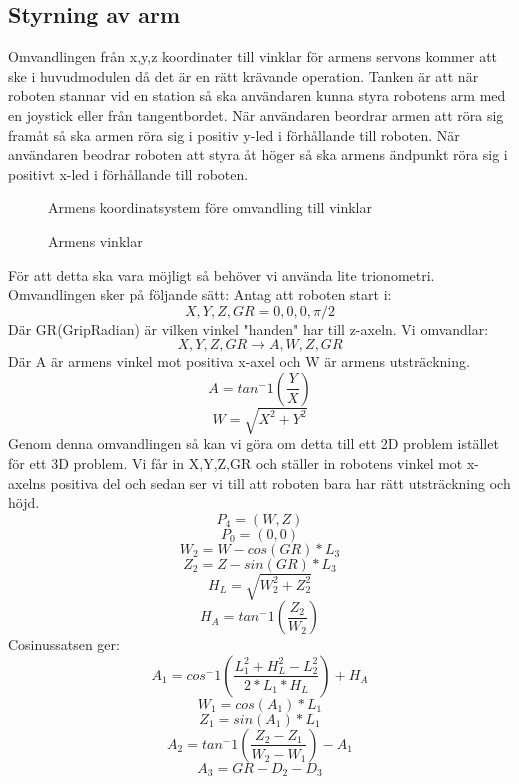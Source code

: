  \subsection{Styrning av arm}
 Omvandlingen från x,y,z koordinater till vinklar för armens servons kommer att ske i huvudmodulen då det är en rätt krävande operation. Tanken är att när roboten stannar vid en station så ska användaren kunna styra robotens arm med en joystick eller från tangentbordet. När användaren beordrar armen att röra sig framåt så ska armen röra sig i positiv y-led i förhållande till roboten. När användaren beodrar roboten att styra åt höger så ska armens ändpunkt röra sig i positivt x-led i förhållande till roboten.
 \newline
 \begin{figure}[h]
 \centerline{}
 \caption{Armens koordinatsystem före omvandling till vinklar}
 \end{figure}
 \begin{figure}[h]
\centerline{}
\caption{Armens vinklar}
\end{figure}
\newline
 För att detta ska vara möjligt så behöver vi använda lite trionometri. Omvandlingen sker på följande sätt:
Antag att roboten start i: $$X,Y,Z,GR=0,0,0,\pi/2$$
Där GR(GripRadian) är vilken vinkel "handen" har till z-axeln.\newline
Vi omvandlar:$$ X,Y,Z,GR\rightarrow A,W,Z,GR$$ 
Där A är armens vinkel mot positiva x-axel och W är armens utsträckning.
$$A=tan^-1(\dfrac{Y}{X}) $$
$$W=\sqrt{X^2+Y^2}$$
Genom denna omvandlingen så kan vi göra om detta till ett 2D problem istället för ett 3D problem. Vi får in X,Y,Z,GR och ställer in robotens vinkel mot x-axelns positiva del och sedan ser vi till att roboten bara har rätt utsträckning och höjd.
$$P_4=(W,Z)$$
$$P_0=(0,0)$$
$$W_2=W-cos(GR)*L_3$$
$$Z_2=Z-sin(GR)*L_3$$
$$H_L=\sqrt{W_2^2+Z_2^2}$$
$$H_A=tan^-1(\dfrac{Z_2}{W_2})$$
Cosinussatsen ger:
$$A_1=cos^-1(\dfrac{L_1^2+H_L^2-L_2^2}{2*L_1*H_L})+H_A$$
$$W_1=cos(A_1)*L_1$$
$$Z_1=sin(A_1)*L_1$$
$$A_2=tan^-1(\dfrac{Z_2-Z_1}{W_2-W_1})-A_1$$
$$A_3=GR-D_2-D_3$$

